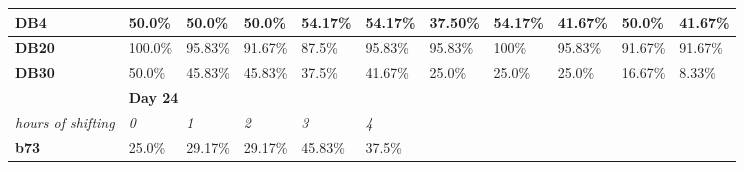 \documentclass[a4paper]{article}
\begin{document}
\begin{table}[H]
{\begin{tabular}{lllllllllll}
\multicolumn{1}{|l|}{\textbf{DB4}} & \multicolumn{1}{l|}{\cellcolor[HTML]{BBDAFF}50.0\%} & \multicolumn{1}{l|}{\cellcolor[HTML]{FFFE65}50.0\%} & \multicolumn{1}{l|}{\cellcolor[HTML]{FFFE65}50.0\%} & \multicolumn{1}{l|}{\cellcolor[HTML]{4ECF94}54.17\%} & \multicolumn{1}{l|}{\cellcolor[HTML]{4ECF94}54.17\%} & \multicolumn{1}{l|}{\cellcolor[HTML]{BBDAFF}37.50\%} & \multicolumn{1}{l|}{\cellcolor[HTML]{4ECF94}54.17\%} & \multicolumn{1}{l|}{\cellcolor[HTML]{4ECF94}41.67\%} & \multicolumn{1}{l|}{\cellcolor[HTML]{4ECF94}50.0\%} & \multicolumn{1}{l|}{\cellcolor[HTML]{4ECF94}41.67\%} \\ \hline
\multicolumn{1}{|l|}{\textbf{DB20}} & \multicolumn{1}{l|}{\cellcolor[HTML]{BBDAFF}100.0\%} & \multicolumn{1}{l|}{\cellcolor[HTML]{EA6D67}95.83\%} & \multicolumn{1}{l|}{\cellcolor[HTML]{EA6D67}91.67\%} & \multicolumn{1}{l|}{\cellcolor[HTML]{EA6D67}87.5\%} & \multicolumn{1}{l|}{\cellcolor[HTML]{EA6D67}95.83\%} & \multicolumn{1}{l|}{\cellcolor[HTML]{BBDAFF}95.83\%} & \multicolumn{1}{l|}{\cellcolor[HTML]{4ECF94}100\%} & \multicolumn{1}{l|}{\cellcolor[HTML]{FFFE65}95.83\%} & \multicolumn{1}{l|}{\cellcolor[HTML]{EA6D67}91.67\%} & \multicolumn{1}{l|}{\cellcolor[HTML]{EA6D67}91.67\%} \\ \hline
\multicolumn{1}{|l|}{\textbf{DB30}} & \multicolumn{1}{l|}{\cellcolor[HTML]{BBDAFF}50.0\%} & \multicolumn{1}{l|}{\cellcolor[HTML]{EA6D67}45.83\%} & \multicolumn{1}{l|}{\cellcolor[HTML]{EA6D67}45.83\%} & \multicolumn{1}{l|}{\cellcolor[HTML]{EA6D67}37.5\%} & \multicolumn{1}{l|}{\cellcolor[HTML]{EA6D67}41.67\%} & \multicolumn{1}{l|}{\cellcolor[HTML]{BBDAFF}25.0\%} & \multicolumn{1}{l|}{\cellcolor[HTML]{FFFE65}25.0\%} & \multicolumn{1}{l|}{\cellcolor[HTML]{FFFE65}25.0\%} & \multicolumn{1}{l|}{\cellcolor[HTML]{EA6D67}16.67\%} & \multicolumn{1}{l|}{\cellcolor[HTML]{EA6D67}8.33\%} \\ \hline
\multicolumn{1}{|l|}{} & \multicolumn{5}{l|}{\textbf{Day 24}} & \multicolumn{5}{l}{\cellcolor[HTML]{FFFFFF}} \\ \cline{1-6}
\multicolumn{1}{|l|}{\textit{hours of shifting}} & \multicolumn{1}{l|}{\textit{0}} & \multicolumn{1}{l|}{\textit{1}} & \multicolumn{1}{l|}{\textit{2}} & \multicolumn{1}{l|}{\textit{3}} & \multicolumn{1}{l|}{\textit{4}} & \multicolumn{5}{l}{\cellcolor[HTML]{FFFFFF}} \\ \cline{1-6}
\multicolumn{1}{|l|}{\textbf{b73}} & \multicolumn{1}{l|}{\cellcolor[HTML]{BBDAFF}25.0\%} & \multicolumn{1}{l|}{\cellcolor[HTML]{4ECF94}29.17\%} & \multicolumn{1}{l|}{\cellcolor[HTML]{4ECF94}29.17\%} & \multicolumn{1}{l|}{\cellcolor[HTML]{4ECF94}45.83\%} & \multicolumn{1}{l|}{\cellcolor[HTML]{4ECF94}37.5\%} & \multicolumn{5}{l}{\cellcolor[HTML]{FFFFFF}} \\ \cline{1-6}

\end{tabular}}
\end{table}
\end{document}
